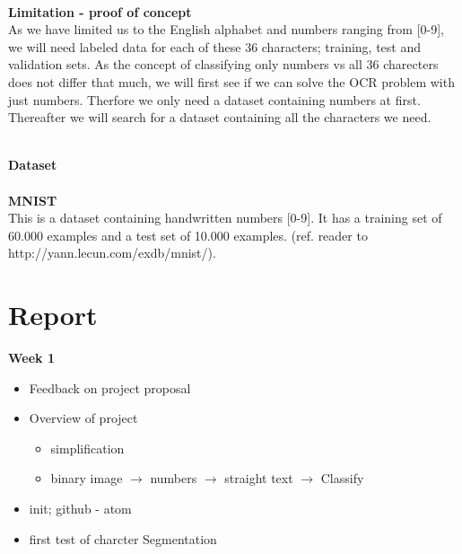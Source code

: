 \documentclass[11pt,a4paper,english]{article}
\newenvironment{loggentry}[2]%
{\noindent\textbf{#2}\marginnote{#1}\\}{\vspace{0.5cm}}
\begin{document}
\noindent \\ \textbf{Limitation - proof of concept}
\noindent \\
As we have limited us to the English alphabet and numbers ranging from [0-9],
we will need labeled data for each of these 36 characters; training, test and
validation sets. As the concept of classifying only numbers vs all 36
charecters does not differ that much, we will first see if we can solve the OCR
problem with just numbers. Therfore we only need a dataset containing numbers
at first. Thereafter we will search for a dataset containing all the characters
we need.

\noindent \\ \textbf{Dataset}
\noindent \\
\noindent \\ \textbf{MNIST}
\noindent \\ This is a dataset containing handwritten numbers [0-9].
It has a training set of 60.000 examples and a test set of 10.000 examples.
(ref. reader to http://yann.lecun.com/exdb/mnist/).























\newpage
\section*{Report}
\begin{loggentry}{19.04.18}{Week 1}
\begin{itemize}
  \item{Feedback on project proposal}
  \item{Overview of project}
    \begin{itemize}
     \item{simplification}
     \item{binary image $\rightarrow$ numbers $\rightarrow$ straight text $\rightarrow$ Classify}
   \end{itemize}
  \item{init; github - atom}
  \item{first test of charcter Segmentation}
\end{itemize}
\end{loggentry}
\end{document}
